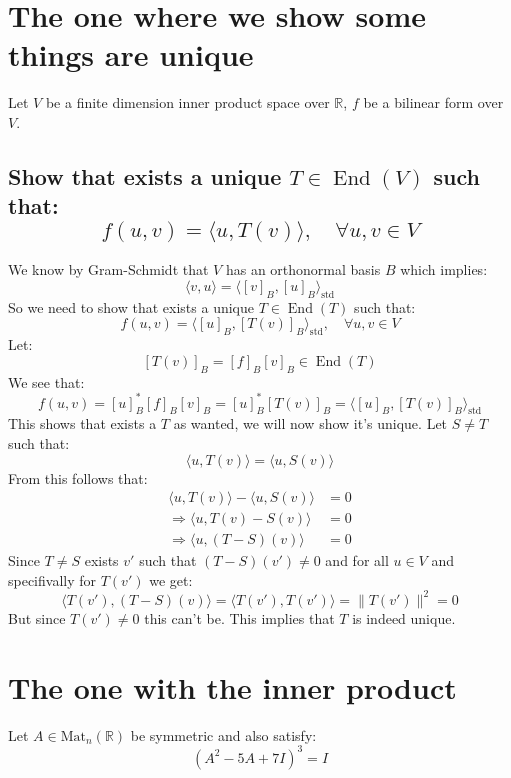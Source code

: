 \documentclass[11pt,a4paper]{article}
\theoremstyle{plain}
\DeclareMathOperator{\End}{End}
\DeclareMathOperator{\std}{std}
\newcommand{\R}{\mathbb{R}}
\newcommand{\ip}[2]{\langle #1, #2 \rangle}
\begin{document}
	
	
	
	\newpage
	
	\section{The one where we show some things are unique}
	Let $V$ be a finite dimension inner product space over $\R$, $f$ be a 
	bilinear form over $V$.
	\subsection{Show that exists a unique $T\in\End(V)$ such that:
	\[
		f(u,v) = \ip{u}{T(v)}, \quad \forall u,v\in V
	\]}
	We know by Gram-Schmidt that $V$ has an orthonormal basis $B$ which 
	implies:
	\[
		\ip{v}{u} = \ip{[v]_B}{[u]_B}_{\std}
	\]
	So we need to show that exists a unique $T\in\End(T)$ such that:
	\[
		f(u,v) = \ip{[u]_B}{[T(v)]_B}_{\std}, \quad \forall u,v\in V
	\]
	Let:
	\[
		[T(v)]_B = [f]_B [v]_B \in \End(T)
	\]
	We see that:
	\[
		f(u,v) = [u]_B^* [f]_B [v]_B = [u]_B^* [T(v)]_B
		= \ip{[u]_B}{[T(v)]_B}_{\std}
	\]
	This shows that exists a $T$ as wanted, we will now show it's unique.
	Let $S\neq T$ such that:
	\[
		\ip{u}{T(v)} = \ip{u}{S(v)}
	\]
	From this follows that:
	\begin{align*}
		\ip{u}{T(v)} - \ip{u}{S(v)} &= 0 \\ \Rightarrow
		\ip{u}{T(v)-S(v)} &= 0 \\ \Rightarrow
		\ip{u}{(T-S)(v)} &= 0
	\end{align*}
	Since $T \neq S$ exists $v'$ such that $(T-S)(v')\neq 0$ and for all 
	$u\in V$ and specifivally for $T(v')$ we get:
	\[
		\ip{T(v')}{(T-S)(v)} = \ip{T(v')}{T(v')} = \|T(v')\|^2 = 0
	\]
	But since $T(v') \neq 0$ this can't be. This implies that $T$ is indeed
	unique.
	
	\newpage
	\section{The one with the inner product}
	Let $A\in \mathrm{Mat}_n(\R)$ be symmetric and also satisfy:
	\[
		(A^2-5A+7I)^3 = I
	\]
\end{document}

